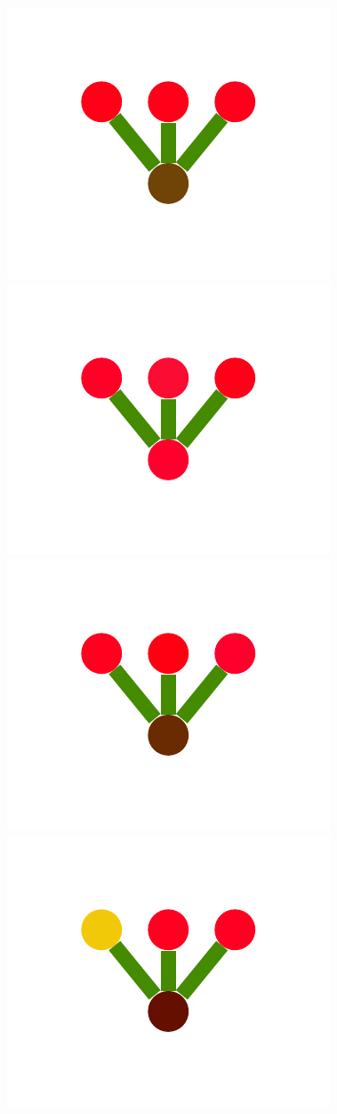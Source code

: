 \documentclass[a4paper,10pt]{article}
\begin{document}
\begin{figure}
{    \includegraphics[scale=.26]{./figures/4-2-1-noisyprog-postA-5.pdf}
    \includegraphics[scale=.26]{./figures/4-2-1-noisyprog-postA-6.pdf}
    \includegraphics[scale=.26]{./figures/4-2-1-noisyprog-postA-7.pdf}
    \includegraphics[scale=.26]{./figures/4-2-1-noisyprog-postA-8.pdf}
}
\end{figure}
\end{document}
